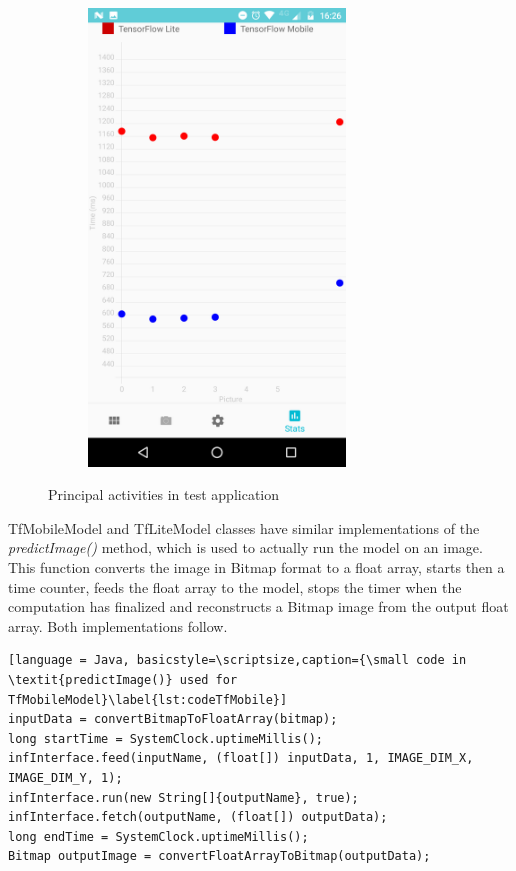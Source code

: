 \begin{figure}[]
\begin{subfigure}[p]{0.45\textwidth}
	  \includegraphics[width=0.75\textwidth]{img/app/stats.png}
	  \label{fig:StatsActivity}
	\end{subfigure}
	\caption[] {\footnotesize Principal activities in test application}
	\label{fig:Activities}
\end{figure}
TfMobileModel and TfLiteModel classes have similar implementations of the \textit{predictImage()} method, which is used to actually run the model on an image. This function converts the image in Bitmap format to a float array, starts then a time counter, feeds the float array to the model, stops the timer when the computation has finalized and reconstructs a Bitmap image from the output float array. Both implementations follow. \\
\begin{lstlisting}[language = Java, basicstyle=\scriptsize,caption={\small code in \textit{predictImage()} used for TfMobileModel}\label{lst:codeTfMobile}]
inputData = convertBitmapToFloatArray(bitmap);
long startTime = SystemClock.uptimeMillis();
infInterface.feed(inputName, (float[]) inputData, 1, IMAGE_DIM_X, IMAGE_DIM_Y, 1);
infInterface.run(new String[]{outputName}, true);
infInterface.fetch(outputName, (float[]) outputData);
long endTime = SystemClock.uptimeMillis();
Bitmap outputImage = convertFloatArrayToBitmap(outputData);
\end{lstlisting}

